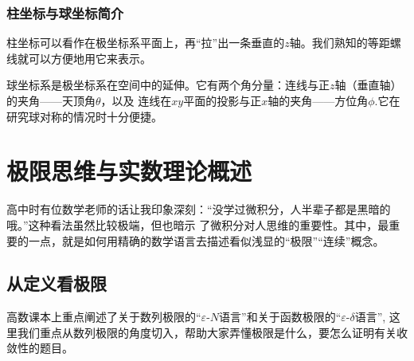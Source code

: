 \begin{center}
    \quad
\end{center}

\subsubsection{柱坐标与球坐标简介}
柱坐标可以看作在极坐标系平面上，再“拉”出一条垂直的$z$轴。我们熟知的等距螺线就可以方便地用它来表示。

球坐标系是极坐标系在空间中的延伸。它有两个角分量：连线与正$z$轴（垂直轴）的夹角——天顶角$\theta$，以及
连线在$xy$平面的投影与正$x$轴的夹角——方位角$\phi$.它在研究球对称的情况时十分便捷。
\section{极限思维与实数理论概述}
高中时有位数学老师的话让我印象深刻：“没学过微积分，人半辈子都是黑暗的哦。”这种看法虽然比较极端，但也暗示
了微积分对人思维的重要性。其中，最重要的一点，就是如何用精确的数学语言去描述看似浅显的“极限”“连续”概念。

\subsection{从定义看极限}\label{continous property}
高数课本上重点阐述了关于数列极限的“$\varepsilon  \text{-} N$语言”和关于函数极限的“$\varepsilon  \text{-} \delta$语言”,
这里我们重点从数列极限的角度切入，帮助大家弄懂极限是什么，要怎么证明有关收敛性的题目。



